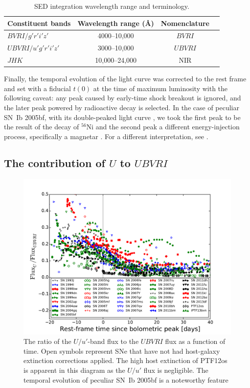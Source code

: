 \documentclass[a4paper,fleqn,usenatbib]{mnras}
\begin{document}
\begin{table}
	\centering
	\caption{SED integration wavelength range and terminology.}
	\begin{tabular}{lccc}
	\hline
	Constituent bands & Wavelength range (\AA) & Nomenclature\\ 
	\hline
	$BVRI/g'r'i'z'$ & 4000--10,000 & $BVRI$ \\
	$UBVRI/u'g'r'i'z'$ & 3000--10,000 & $UBVRI$ \\
	$JHK$ & 10,000--24,000 & NIR \\
	\hline
	\end{tabular}
	\label{bands}
\end{table}

Finally, the temporal evolution of the light curve was corrected to the rest frame and set with a fiducial $t(0)$ at the time of maximum luminosity with the following caveat: any peak caused by early-time shock breakout \citep[e.g., SN IIb 2013df][]{Vandyk2014} is ignored, and the later peak powered by radioactive decay is selected. In the case of peculiar SN~Ib 2005bf, with its double-peaked light curve \citep{Tominaga2005}, we took the first peak to be the result of the decay of $^{56}$Ni and the second peak a different energy-injection process, specifically a magnetar \citep{Maeda2007}. For a different interpretation, see \cite{Folatelli2006}. 

\subsection{The contribution of $U$ to $UBVRI$}
\begin{figure}
\centering
\includegraphics[scale=0.4]{U-percent.pdf}
\caption{The ratio of the $U/u'$-band flux to the $UBVRI$ flux as a function of time. Open symbols represent SNe that have not had host-galaxy extinction corrections applied. The high host extinction of PTF12os is apparent in this diagram as the $U/u'$ flux is negligible. The temporal evolution of peculiar SN~Ib 2005bf is a noteworthy feature}
\label{fig:Uper}
\end{figure}
\end{document}
